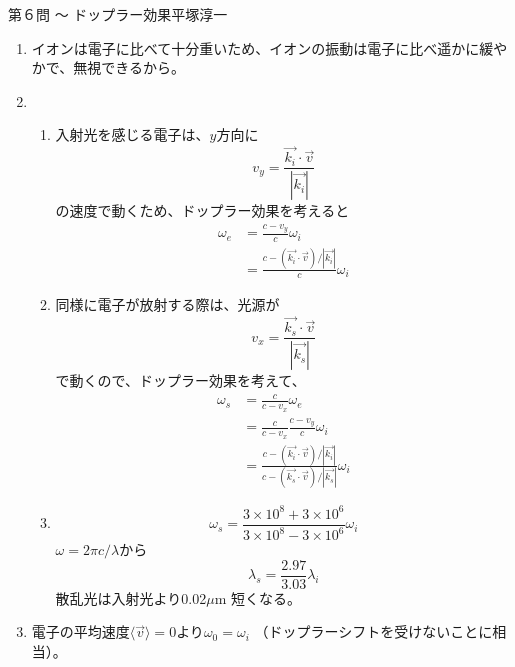 \begin{answer}{第６問 〜 ドップラー効果}{平塚淳一}
\begin{enumerate}
\def\<{\langle}
\def\>{\rangle}
\def\kB{k_{\mathrm B}}
\item イオンは電子に比べて十分重いため、イオンの振動は電子に比べ遥かに緩やかで、無視できるから。
\item 
  \begin{enumerate}
  \item 入射光を感じる電子は、$y$方向に
    \begin{equation}
    v_y=\frac{\overrightarrow{k_i}\cdot \overrightarrow{v}}{|\overrightarrow{k_i}|}
    \end{equation}
    の速度で動くため、ドップラー効果を考えると
    \begin{align}
    \omega_e&=\frac{c-v_y}{c}\omega_i\\
    &=\frac{c-(\overrightarrow{k_i}\cdot \overrightarrow{v})/|\overrightarrow{k_i}|}{c}\omega_i
    \end{align}
  \item 
    同様に電子が放射する際は、光源が
    \begin{equation}
    v_x=\frac{\overrightarrow{k_s}\cdot \overrightarrow{v}}{|\overrightarrow{k_s}|}
    \end{equation}
    で動くので、ドップラー効果を考えて、
    \begin{align}
    \omega_s&=\frac{c}{c-v_x}\omega_e\\
    &=\frac{c}{c-v_x}\frac{c-v_y}{c}\omega_i\\
    &=\frac{c-(\overrightarrow{k_i}\cdot \overrightarrow{v})/|\overrightarrow{k_i}|}{c-(\overrightarrow{k_s}\cdot \overrightarrow{v})/|\overrightarrow{k_s}|}\omega_i
    \end{align}
  \item 
    \begin{equation}
    \omega_s=\frac{3\times 10^8+3\times 10^6}{3\times 10^8-3\times 10^6}\omega_i
    \end{equation}
    $\omega=2\pi c/\lambda$から
    \begin{equation}
    \lambda_s=\frac{2.97}{3.03}\lambda_i
    \end{equation}
    散乱光は入射光より0.02$\mu$m 短くなる。
  \end{enumerate}
\item 電子の平均速度$\<\overrightarrow{v}\>=0$より$\omega_0=\omega_i$
  （ドップラーシフトを受けないことに相当）。
  \begin{equation}

\end{equation}
\end{enumerate}
\end{answer}
